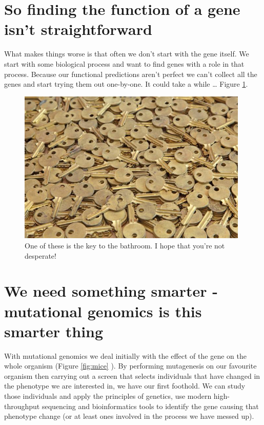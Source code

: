 \documentclass[12pt,]{book}
\theoremstyle{definition}
\theoremstyle{definition}
\theoremstyle{remark}
\begin{document}
\section*{So finding the function of a gene isn't
straightforward}\label{so-finding-the-function-of-a-gene-isnt-straightforward}

What makes things worse is that often we don't start with the gene
itself. We start with some biological process and want to find genes
with a role in that process. Because our functional predictions aren't
perfect we can't collect all the genes and start trying them out
one-by-one. It could take a while \ldots{} Figure \ref{fig:keys}.

\begin{figure}
\includegraphics[width=4.33in]{assets/keys} \caption{One of these is the key to the bathroom. I hope that you're not desperate!}\label{fig:keys}
\end{figure}

\section*{We need something smarter - mutational genomics is this
smarter
thing}\label{we-need-something-smarter---mutational-genomics-is-this-smarter-thing}

With mutational genomics we deal initially with the effect of the gene
on the whole organism (Figure \ref{fig:mice} ). By performing
mutagenesis on our favourite organism then carrying out a screen that
selects individuals that have changed in the phenotype we are interested
in, we have our first foothold. We can study those individuals and apply
the principles of genetics, use modern high-throughput sequencing and
bioinformatics tools to identify the gene causing that phenotype change
(or at least ones involved in the process we have messed up).
\end{document}

